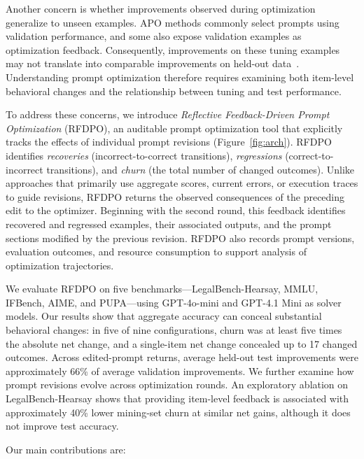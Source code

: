 \documentclass[10pt]{article} %
\begin{document}
Another concern is whether improvements observed during optimization generalize to unseen examples. APO methods commonly select prompts using validation performance, and some also expose validation examples as optimization feedback. Consequently, improvements on these tuning examples may not translate into comparable improvements on held-out data~\citep{recht2019imagenet}. Understanding prompt optimization therefore requires examining both item-level behavioral changes and the relationship between tuning and test performance.

To address these concerns, we introduce \emph{Reflective Feedback-Driven Prompt Optimization} (RFDPO), an auditable prompt optimization tool that explicitly tracks the effects of individual prompt revisions (Figure~\ref{fig:arch}). RFDPO identifies \emph{recoveries} (incorrect-to-correct transitions), \emph{regressions} (correct-to-incorrect transitions), and \emph{churn} (the total number of changed outcomes). Unlike approaches that primarily use aggregate scores, current errors, or execution traces to guide revisions, RFDPO returns the observed consequences of the preceding edit to the optimizer. Beginning with the second round, this feedback identifies recovered and regressed examples, their associated outputs, and the prompt sections modified by the previous revision. RFDPO also records prompt versions, evaluation outcomes, and resource consumption to support analysis of optimization trajectories.

We evaluate RFDPO on five benchmarks---LegalBench-Hearsay, MMLU, IFBench, AIME, and PUPA---using GPT-4o-mini and GPT-4.1 Mini as solver models. Our results show that aggregate accuracy can conceal substantial behavioral changes: in five of nine configurations, churn was at least five times the absolute net change, and a single-item net change concealed up to 17 changed outcomes. Across edited-prompt returns, average held-out test improvements were approximately 66\% of average validation improvements. We further examine how prompt revisions evolve across optimization rounds. An exploratory ablation on LegalBench-Hearsay shows that providing item-level feedback is associated with approximately 40\% lower mining-set churn at similar net gains, although it does not improve test accuracy.

Our main contributions are:
\end{document}
